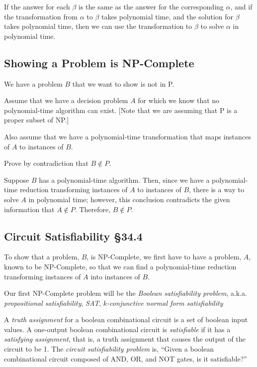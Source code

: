 If the answer for each $\beta$ is the same as the answer for the corresponding $\alpha$, and if the transformation from $\alpha$ to $\beta$ takes polynomial time, and the solution for $\beta$ takes polynomial time, then we can use the transformation to $\beta$ to solve $\alpha$ in polynomial time.  


\subsection{Showing a Problem is NP-Complete}

We have a problem $B$ that we want to show is not in P.  

Assume that we have a decision problem $A$ for which we know that no polynomial-time algorithm can exist.  [Note that we are assuming that P is a proper subset of NP.]

Also assume that we have a polynomial-time transformation that maps instances of $A$ to instances of $B$.  

Prove by contradiction that $B \notin P$.  

Suppose $B$ has a polynomial-time algorithm.  Then, since we have a polynomial-time reduction transforming instances of $A$ to instances of $B$, there is a way to solve $A$ in polynomial time; however, this conclusion contradicts the given information that $A \notin P$.  Therefore, $B \notin P$.  

\subsection{Circuit Satisfiability \S 34.4}

To show that a problem, $B$, is NP-Complete, we first have to have a problem, $A$, known to be NP-Complete, so that we can find a polynomial-time reduction transforming instances of $A$ into instances of $B$.  

Our first NP-Complete problem will be the {\it Boolean satisfiability problem}, a.k.a. {\it propositional satisfiability}, {\it SAT}, {\it $k$-conjunctive normal form satisfiability}

A {\it truth assignment} for a boolean combinational circuit is a set of boolean input values.  A one-output boolean combinational circuit is {\it satisfiable} if it has a {\it satisfying assignment}, that is, a truth assignment that causes the output of the circuit to be 1.  The {\it circuit satisfiability problem} is, ``Given a boolean combinational circuit composed of AND, OR, and NOT gates, is it satisfiable?''  

